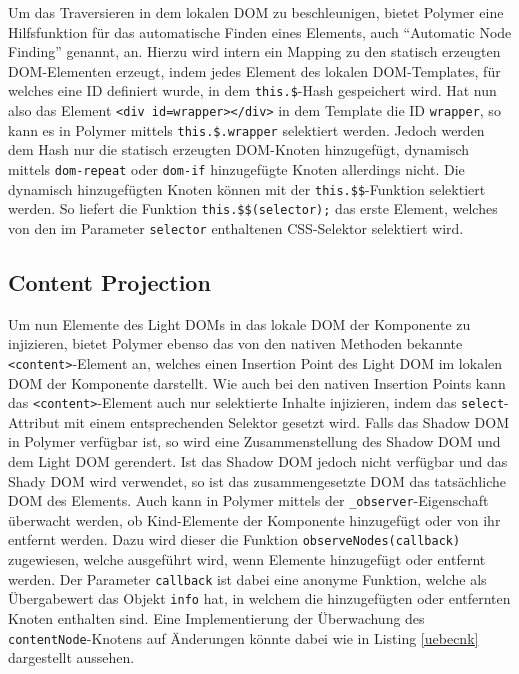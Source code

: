 Um das Traversieren in dem lokalen \ac{DOM} zu beschleunigen, bietet Polymer eine Hilfsfunktion für das automatische Finden eines Elements, auch ``Automatic Node Finding'' genannt, an. Hierzu wird intern ein Mapping zu den statisch erzeugten \ac{DOM}-Elementen erzeugt, indem jedes Element des lokalen \ac{DOM}-Templates, für welches eine ID definiert wurde, in dem \texttt{this.\$}-Hash gespeichert wird. Hat nun also das Element \texttt{\textless{}div\ id=\dq wrapper\dq\textgreater{}\textless{}/div\textgreater{}} in dem Template die ID \texttt{wrapper}, so kann es in Polymer mittels \texttt{this.\$.wrapper} selektiert werden. Jedoch werden dem Hash nur die statisch erzeugten \ac{DOM}-Knoten hinzugefügt, dynamisch mittels \texttt{dom-repeat} oder \texttt{dom-if} hinzugefügte Knoten allerdings nicht. Die dynamisch hinzugefügten Knoten können mit der \texttt{this.\$\$}-Funktion selektiert werden. So liefert die Funktion \texttt{this.\$\$(selector);} das erste Element, welches von den im Parameter \texttt{selector} enthaltenen \ac{CSS}-Selektor selektiert wird.


\subsection{Content Projection}\label{polymer-content-projection}

Um nun Elemente des Light \ac{DOM}s in das lokale \ac{DOM} der Komponente zu injizieren, bietet Polymer ebenso das von den nativen Methoden bekannte \texttt{\textless{}content\textgreater{}}-Element an, welches einen Insertion Point des Light \ac{DOM} im lokalen \ac{DOM} der Komponente darstellt. Wie auch bei den nativen Insertion Points kann das \texttt{\textless{}content\textgreater{}}-Element auch nur selektierte Inhalte injizieren, indem das \texttt{select}-Attribut mit einem entsprechenden Selektor gesetzt wird. Falls das Shadow \ac{DOM} in Polymer verfügbar ist, so wird eine Zusammenstellung des Shadow \ac{DOM} und dem Light \ac{DOM} gerendert. Ist das Shadow \ac{DOM} jedoch nicht verfügbar und das Shady \ac{DOM} wird verwendet, so ist das zusammengesetzte \ac{DOM} das tatsächliche \ac{DOM} des Elements. Auch kann in Polymer mittels der \texttt{\_observer}-Eigenschaft überwacht werden, ob Kind-Elemente der Komponente hinzugefügt oder von ihr entfernt werden. Dazu wird dieser die Funktion \texttt{observeNodes(callback)} zugewiesen, welche ausgeführt wird, wenn Elemente hinzugefügt oder entfernt werden. Der Parameter \texttt{callback} ist dabei eine anonyme Funktion, welche als Übergabewert das Objekt \texttt{info} hat, in welchem die hinzugefügten oder entfernten Knoten enthalten sind. Eine Implementierung der Überwachung des \texttt{contentNode}-Knotens auf Änderungen könnte dabei wie in Listing \ref{uebecnk} dargestellt aussehen.

